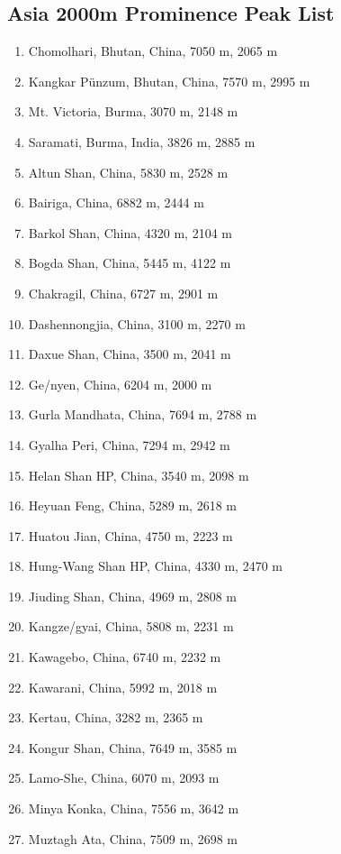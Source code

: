 \documentclass[10pt,twocolumn,letterpaper]{article}
\begin{document}
\subsection{Asia 2000m Prominence Peak List}
\begin{flushleft}
\begin{enumerate}
    \item Chomolhari, Bhutan, China, 7050 m, 2065 m
    \item Kangkar Pünzum, Bhutan, China, 7570 m, 2995 m
    \item Mt. Victoria, Burma, 3070 m, 2148 m
    \item Saramati, Burma, India, 3826 m, 2885 m
    \item Altun Shan, China, 5830 m, 2528 m
    \item Bairiga, China, 6882 m, 2444 m
    \item Barkol Shan, China, 4320 m, 2104 m
    \item Bogda Shan, China, 5445 m, 4122 m
    \item Chakragil, China, 6727 m, 2901 m
    \item Dashennongjia, China, 3100 m, 2270 m
    \item Daxue Shan, China, 3500 m, 2041 m
    \item Ge/nyen, China, 6204 m, 2000 m
    \item Gurla Mandhata, China, 7694 m, 2788 m
    \item Gyalha Peri, China, 7294 m, 2942 m
    \item Helan Shan HP, China, 3540 m, 2098 m
    \item Heyuan Feng, China, 5289 m, 2618 m
    \item Huatou Jian, China, 4750 m, 2223 m
    \item Hung-Wang Shan HP, China, 4330 m, 2470 m
    \item Jiuding Shan, China, 4969 m, 2808 m
    \item Kangze/gyai, China, 5808 m, 2231 m
    \item Kawagebo, China, 6740 m, 2232 m
    \item Kawarani, China, 5992 m, 2018 m
    \item Kertau, China, 3282 m, 2365 m
    \item Kongur Shan, China, 7649 m, 3585 m
    \item Lamo-She, China, 6070 m, 2093 m
    \item Minya Konka, China, 7556 m, 3642 m
    \item Muztagh Ata, China, 7509 m, 2698 m

\end{enumerate}
\end{flushleft}
\end{document}
